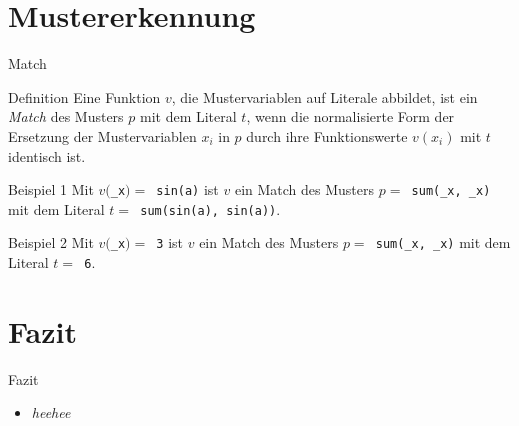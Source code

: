 \documentclass{beamer}
\begin{document}
\section{Mustererkennung}
\begin{frame}[fragile]{Match}
	\begin{block}{Definition}
		Eine Funktion $v$, die Mustervariablen auf Literale abbildet, ist ein \emph{Match} des Musters $p$ mit dem Literal $t$, wenn die normalisierte Form der Ersetzung der Mustervariablen $x_i$ in $p$ durch ihre Funktionswerte $v(x_i)$ mit $t$ identisch ist.
	\end{block}
	
	\pause
	\begin{block}{Beispiel 1}
		Mit $v($\verb~_x~$) =$\verb~ sin(a)~ ist $v$ ein Match des
		Musters $p =$\verb~ sum(_x, _x)~ mit dem Literal $t =$\verb~ sum(sin(a), sin(a))~.
	\end{block}
	
	\pause
	\begin{block}{Beispiel 2}
		Mit $v($\verb~_x~$) =$\verb~ 3~ ist $v$ ein Match des
		Musters $p =$\verb~ sum(_x, _x)~ mit dem Literal $t =$\verb~ 6~.
	\end{block}
\end{frame}





\section{Fazit}
\begin{frame}{Fazit}
	\begin{itemize}
		\item{\emph{heehee}}
	\end{itemize}
\end{frame}

\end{document}
